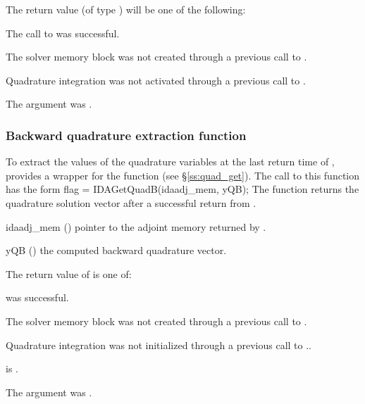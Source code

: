 {
  The return value  (of type ) will be one of the following:
  \begin{args}
  \item[\Id{IDA\_SUCCESS}]
    The call to  was successful.
  \item[\Id{IDA\_MEM\_NULL}] 
    The {\idas} solver memory block was not created through a 
    previous call to .
  \item[\Id{IDA\_NO\_QUAD}] 
    Quadrature integration was not activated through a 
    previous call to .
  \item[\Id{IDA\_ADJMEM\_NULL}]
    The  argument was .
  \end{args}
}
{}

\subsubsection{Backward quadrature extraction function}

To extract the values of the quadrature variables at the last return time
of , {\idas} provides a wrapper for the function 
(see \S\ref{ss:quad_get}). The call to this function has the form
{
  flag = IDAGetQuadB(idaadj\_mem, yQB);
}
{
  The function  returns the quadrature solution vector after
  a successful return from .
}
{
  \begin{args}
  \item[idaadj\_mem] ()
    pointer to the adjoint memory returned by .
  \item[yQB] ()
    the computed backward quadrature vector.
  \end{args}
}
{
  The return value  of  is one of:
  \begin{args}
  \item[\Id{IDA\_SUCCESS}] 
     was successful.
  \item[\Id{IDA\_MEM\_NULL}] 
    The {\idas} solver memory block was not created through a 
    previous call to .
  \item[\Id{IDA\_NO\_QUAD}] 
    Quadrature integration was not initialized through a 
    previous call to ..
  \item[\Id{Ida\_BAD\_DKY}] 
     is .
  \item[\Id{IDA\_ADJMEM\_NULL}]
    The  argument was .
  \end{args}
}
{}

